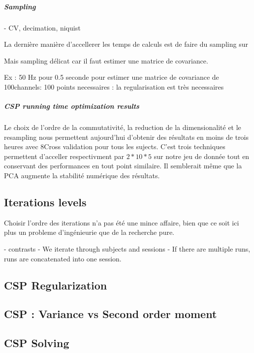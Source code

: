 \subparagraph{Sampling}

- CV, decimation, niquist

La dernière manière d'accellerer les temps de calculs est de faire du sampling sur 

Mais sampling délicat car il faut estimer une matrice de covariance.

Ex : 50 Hz pour 0.5 seconde pour estimer une matrice de covariance de 100channels: 100 points necessaires : la regularisation est très necessaires


\subparagraph{CSP running time optimization results}

Le choix de l'ordre de la commutativité, la reduction de la dimensionalité et le resampling nous permettent aujourd'hui d'obtenir des résultats en moins de trois heures avec 8Cross validation pour tous les sujects. C'est trois techniques permettent d'acceller respectivment par $2*10*5$ sur notre jeu de donnée tout en conservant des performances en tout point similaire. Il semblerait même que la PCA augmente la stabilité numérique des résultats.






\subsection{Iterations levels}

Choisir l'ordre des iterations n'a pas été une mince affaire, bien que ce soit ici plus un probleme d'ingénieurie que de la recherche pure.

- contrasts
- We iterate through subjects and sessions
- If there are multiple runs, runs are concatenated into one session.

\subsection{CSP Regularization}

\subsection{CSP : Variance vs Second order moment}

\subsection{CSP Solving}


